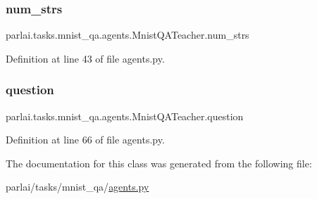 \subsubsection{\texorpdfstring{num\+\_\+strs}{num\_strs}}
{\footnotesize\ttfamily parlai.\+tasks.\+mnist\+\_\+qa.\+agents.\+Mnist\+Q\+A\+Teacher.\+num\+\_\+strs}



Definition at line 43 of file agents.\+py.

\mbox{\label{classparlai_1_1tasks_1_1mnist__qa_1_1agents_1_1MnistQATeacher_a79fbc5e429e1ee91b592fc6da4675c54}} 
\subsubsection{\texorpdfstring{question}{question}}
{\footnotesize\ttfamily parlai.\+tasks.\+mnist\+\_\+qa.\+agents.\+Mnist\+Q\+A\+Teacher.\+question}



Definition at line 66 of file agents.\+py.



The documentation for this class was generated from the following file\+:\begin{DoxyCompactItemize}
\item 
parlai/tasks/mnist\+\_\+qa/\hyperlink{parlai_2tasks_2mnist__qa_2agents_8py}{agents.\+py}\end{DoxyCompactItemize}
